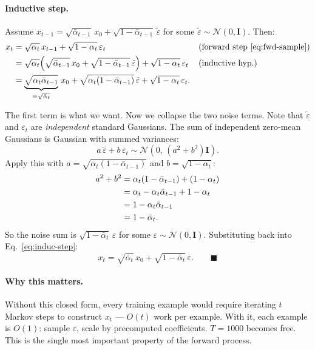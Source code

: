 \documentclass[11pt,a4paper]{article}
\newcommand{\N}{\mathcal{N}}
\newcommand{\eps}{\varepsilon}
\begin{document}
\paragraph{Inductive step.}
Assume $x_{t-1} = \sqrt{\bar{\alpha}_{t-1}}\, x_0 + \sqrt{1-\bar{\alpha}_{t-1}}\,\tilde\eps$ for some $\tilde\eps \sim \N(0,\mathbf{I})$. Then:
\begin{align}
x_t
&= \sqrt{\alpha_t}\, x_{t-1} + \sqrt{1-\alpha_t}\,\eps_t
   && \text{(forward step \eqref{eq:fwd-sample})} \notag\\
&= \sqrt{\alpha_t}\Big(\sqrt{\bar{\alpha}_{t-1}}\, x_0 + \sqrt{1-\bar{\alpha}_{t-1}}\,\tilde\eps\Big) + \sqrt{1-\alpha_t}\,\eps_t
   && \text{(inductive hyp.)} \notag\\
&= \underbrace{\sqrt{\alpha_t \bar{\alpha}_{t-1}}}_{=\sqrt{\bar{\alpha}_t}}\, x_0
   + \sqrt{\alpha_t(1-\bar{\alpha}_{t-1})}\,\tilde\eps
   + \sqrt{1-\alpha_t}\,\eps_t.
   \label{eq:induc-step}
\end{align}

The first term is what we want. Now we collapse the two noise terms.
Note that $\tilde\eps$ and $\eps_t$ are \emph{independent} standard Gaussians.
The sum of independent zero-mean Gaussians is Gaussian with summed
variances:
\[
a\,\tilde\eps + b\,\eps_t \sim \N(0,\,(a^2+b^2)\mathbf{I}).
\]
Apply this with $a = \sqrt{\alpha_t(1-\bar{\alpha}_{t-1})}$ and $b = \sqrt{1-\alpha_t}$:
\begin{align}
a^2 + b^2
&= \alpha_t(1-\bar{\alpha}_{t-1}) + (1-\alpha_t) \notag\\
&= \alpha_t - \alpha_t\bar{\alpha}_{t-1} + 1 - \alpha_t \notag\\
&= 1 - \alpha_t\bar{\alpha}_{t-1} \notag\\
&= 1 - \bar{\alpha}_t.
\end{align}
So the noise sum is $\sqrt{1-\bar{\alpha}_t}\,\eps$ for some
$\eps \sim \N(0,\mathbf{I})$. Substituting back into
Eq.~\eqref{eq:induc-step}:
\[
x_t = \sqrt{\bar{\alpha}_t}\, x_0 + \sqrt{1-\bar{\alpha}_t}\,\eps. \qquad\blacksquare
\]

\paragraph{Why this matters.} Without this closed form, every training
example would require iterating $t$ Markov steps to construct $x_t$
--- $O(t)$ work per example. With it, each example is $O(1)$:
sample $\eps$, scale by precomputed coefficients. $T = 1000$ becomes
free. This is the single most important property of the
forward process.
\end{document}
